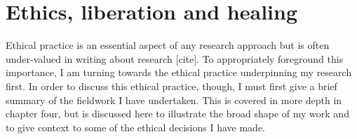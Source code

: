 










\section{Ethics, liberation and healing}
\label{3-ethics}
Ethical practice is an essential aspect of any research approach but is often under-valued in writing about research [cite]. To appropriately foreground this importance, I am turning towards the ethical practice underpinning my research first. In order to discuss this ethical practice, though, I must first give a brief summary of the fieldwork I have undertaken. This is covered in more depth in chapter four, but is discussed here to illustrate the broad shape of my work and to give context to some of the ethical decisions I have made.

